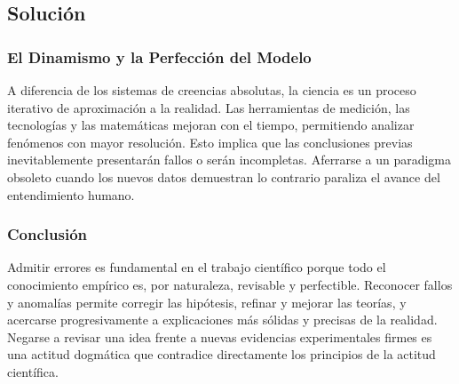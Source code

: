 \documentclass[12pt, a4paper]{article}
\begin{document}
\subsection*{Solución}

\subsubsection*{El Dinamismo y la Perfección del Modelo}
A diferencia de los sistemas de creencias absolutas, la ciencia es un proceso iterativo de aproximación a la realidad. Las herramientas de medición, las tecnologías y las matemáticas mejoran con el tiempo, permitiendo analizar fenómenos con mayor resolución. Esto implica que las conclusiones previas inevitablemente presentarán fallos o serán incompletas. Aferrarse a un paradigma obsoleto cuando los nuevos datos demuestran lo contrario paraliza el avance del entendimiento humano.

\subsubsection*{Conclusión}
Admitir errores es fundamental en el trabajo científico porque todo el conocimiento empírico es, por naturaleza, revisable y perfectible. Reconocer fallos y anomalías permite corregir las hipótesis, refinar y mejorar las teorías, y acercarse progresivamente a explicaciones más sólidas y precisas de la realidad. Negarse a revisar una idea frente a nuevas evidencias experimentales firmes es una actitud dogmática que contradice directamente los principios de la actitud científica.
\end{document}
